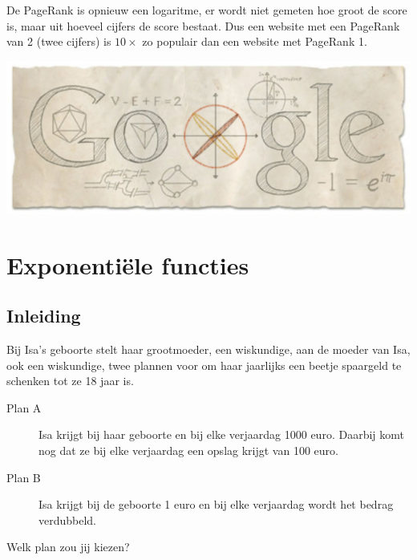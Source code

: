 \documentclass[12pt,twoside]{article}
\begin{document}
\begin{minipage}{0.45\textwidth}
De PageRank is opnieuw een logaritme, er wordt niet gemeten hoe groot de score is, maar uit hoeveel cijfers de score bestaat. Dus een website met een PageRank van 2 (twee cijfers) is $10\times$ zo populair dan een website met PageRank 1.
\end{minipage}
\begin{minipage}{0.55\textwidth}
\includegraphics[width=\textwidth]{pagerank}
\end{minipage}

\pagebreak
\section{Exponentiële functies}

\subsection{Inleiding}

Bij Isa's geboorte stelt haar grootmoeder, een wiskundige, aan de moeder van Isa, ook een wiskundige, twee plannen voor om haar jaarlijks een beetje spaargeld te schenken tot ze 18 jaar is.

\begin{description}
  \item[Plan A] Isa krijgt bij haar geboorte en bij elke verjaardag 1000 euro. Daarbij komt nog dat ze bij elke verjaardag een opslag krijgt van 100 euro.
  \item[Plan B] Isa krijgt bij de geboorte 1 euro en bij elke verjaardag wordt het bedrag verdubbeld.
\end{description}

\begin{oefening}
Welk plan zou jij kiezen?
\end{oefening}
\end{document}
